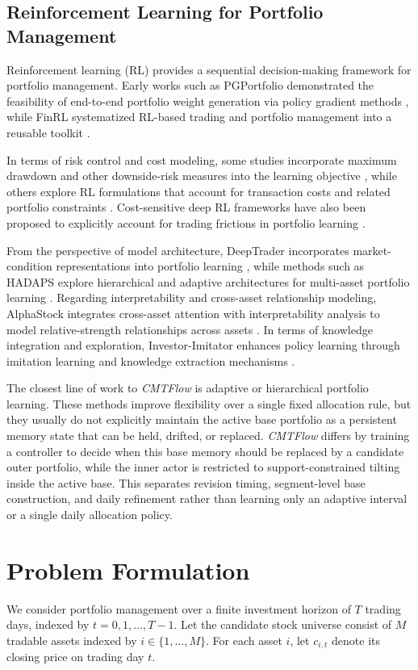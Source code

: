 \documentclass[letterpaper]{article} %
\begin{document}
\subsection{Reinforcement Learning for Portfolio Management}
Reinforcement learning (RL) provides a sequential decision-making framework for portfolio management. Early works such as PGPortfolio demonstrated the feasibility of end-to-end portfolio weight generation via policy gradient methods \citep{4}, while FinRL systematized RL-based trading and portfolio management into a reusable toolkit \citep{5}.

In terms of risk control and cost modeling, some studies incorporate maximum drawdown and other downside-risk measures into the learning objective \citep{11}, while others explore RL formulations that account for transaction costs and related portfolio constraints \citep{23}. Cost-sensitive deep RL frameworks have also been proposed to explicitly account for trading frictions in portfolio learning \citep{24}.

From the perspective of model architecture, DeepTrader incorporates market-condition representations into portfolio learning \citep{6}, while methods such as HADAPS explore hierarchical and adaptive architectures for multi-asset portfolio learning \citep{25}. Regarding interpretability and cross-asset relationship modeling, AlphaStock integrates cross-asset attention with interpretability analysis to model relative-strength relationships across assets \citep{alphastock}. In terms of knowledge integration and exploration, Investor-Imitator enhances policy learning through imitation learning and knowledge extraction mechanisms \citep{8}.

The closest line of work to \textit{CMTFlow} is adaptive or hierarchical portfolio learning. These methods improve flexibility over a single fixed allocation rule, but they usually do not explicitly maintain the active base portfolio as a persistent memory state that can be held, drifted, or replaced. \textit{CMTFlow} differs by training a controller to decide when this base memory should be replaced by a candidate outer portfolio, while the inner actor is restricted to support-constrained tilting inside the active base. This separates revision timing, segment-level base construction, and daily refinement rather than learning only an adaptive interval or a single daily allocation policy.

\section{Problem Formulation}
We consider portfolio management over a finite investment horizon of $T$ trading days, indexed by $t=0,1,\dots,T-1$. Let the candidate stock universe consist of $M$ tradable assets indexed by $i\in\{1,\dots,M\}$. For each asset $i$, let $c_{i,t}$ denote its closing price on trading day $t$.
\end{document}

